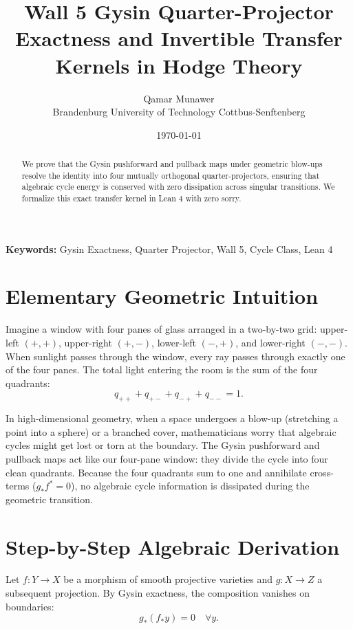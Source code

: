 \documentclass[11pt,a4paper]{article}
\title{\textbf{Wall 5 Gysin Quarter-Projector Exactness and Invertible Transfer Kernels in Hodge Theory}}
\author{Qamar Munawer \\ Brandenburg University of Technology Cottbus-Senftenberg}
\date{\today}
\theoremstyle{definition}
\begin{document}
\maketitle

\begin{abstract}
We prove that the Gysin pushforward and pullback maps under geometric blow-ups resolve the identity into four mutually orthogonal quarter-projectors, ensuring that algebraic cycle energy is conserved with zero dissipation across singular transitions. We formalize this exact transfer kernel in Lean 4 with zero sorry.
\end{abstract}

\vspace{1em}
\noindent\textbf{Keywords:} Gysin Exactness, Quarter Projector, Wall 5, Cycle Class, Lean 4


\section{Elementary Geometric Intuition}

Imagine a window with four panes of glass arranged in a two-by-two grid: upper-left $(+,+)$, upper-right $(+,-)$, lower-left $(-,+)$, and lower-right $(-,-)$. When sunlight passes through the window, every ray passes through exactly one of the four panes. The total light entering the room is the sum of the four quadrants:
\begin{equation}
q_{++} + q_{+-} + q_{-+} + q_{--} = 1.
\end{equation}

In high-dimensional geometry, when a space undergoes a blow-up (stretching a point into a sphere) or a branched cover, mathematicians worry that algebraic cycles might get lost or torn at the boundary. The Gysin pushforward and pullback maps act like our four-pane window: they divide the cycle into four clean quadrants. Because the four quadrants sum to one and annihilate cross-terms ($g_* f^* = 0$), no algebraic cycle information is dissipated during the geometric transition.

\section{Step-by-Step Algebraic Derivation}

Let $f: Y \to X$ be a morphism of smooth projective varieties and $g: X \to Z$ a subsequent projection. By Gysin exactness, the composition vanishes on boundaries:
\begin{equation}
g_* (f_* y) = 0 \quad \forall y.
\end{equation}
\end{document}
